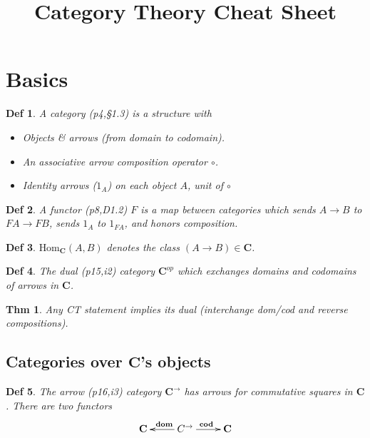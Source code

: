 \documentclass[10pt,twocolumn,letterpaper]{amsart}
\title{Category Theory Cheat Sheet}
\newtheorem{thm}{Thm}[section]
\newtheorem{dfn}{Def}[section]
\newcommand{\defn}[1]{\label{dfn:#1}{\em #1}}
\begin{document}


\section{Basics}

  \begin{dfn}A \defn{category} (p4,\S1.3) is a structure with
  \begin{itemize}
    \item Objects \& arrows (from \defn{domain} to \defn{codomain}).
    \item An associative arrow composition operator $\circ$.
    \item Identity arrows ($1_A$) on each object $A$, unit of $\circ$
  \end{itemize}
  \end{dfn}

  \begin{dfn}A \defn{functor} (p8,D1.2) $F$ is a map between categories which
     sends $A \to B$ to $FA \to FB$, sends $1_A$ to $1_{FA}$, and honors composition.
  \end{dfn}

  \begin{dfn}$\mbox{Hom}_\mathbf{C}(A,B)$ denotes the class $(A \to B) \in \mathbf{C}$.\end{dfn}

  \begin{dfn}The \defn{dual} (p15,i2) category $\mathbf{C}^{op}$ which
    exchanges domains and codomains of arrows in $\mathbf{C}$.
  \end{dfn}

  \begin{thm}Any CT statement implies its dual (interchange dom/cod and reverse compositions).\end{thm}

  \subsection{Categories over $\mathbf{C}$'s objects}

  \begin{dfn}The \defn{arrow} (p16,i3) category $\mathbf{C}^\to$ has arrows
     for commutative squares in $\mathbf{C}$.  There are two functors
     \[\xymatrix{ \mathbf{C} & \ar[l]_{\mathbf{dom}} C^\to \ar[r]^{\mathbf{cod}} & \mathbf{C}}\]
  \end{dfn}
\end{document}

